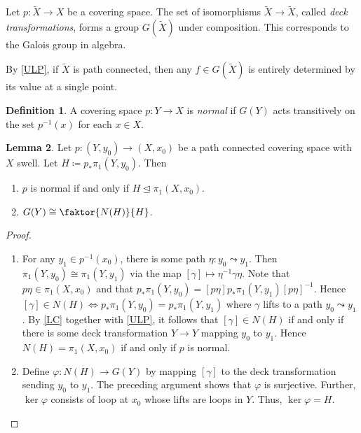 \documentclass[10pt,letterpaper,cm]{nupset}
\theoremstyle{definition}
\newtheorem{definition}{Definition}[subsection]
\theoremstyle{theorem}
\newtheorem{lemma}[definition]{Lemma}
\theoremstyle{remark}
\newcommand{\1}{\mathbb{1}}
\newcommand{\0}{\vec 0}
\begin{document}
\smallskip

Let $p: \widetilde{X} \to X$ be a covering space. The set of isomorphisms $\widetilde{X}  \to \widetilde{X} $, called \textit{deck transformations}, forms a group $G(\widetilde{X})$ under composition. This corresponds to the Galois group in algebra.

By \cref{ULP}, if $\widetilde{X}$ is path connected, then any $f\in G(\widetilde{X})$ is entirely determined by its value at a single point.

\begin{definition}
A covering space $p:Y \to X$ is \textit{normal} if $G(Y)$ acts transitively on the set $p^{-1}(x)$ for each $x\in X$.
\end{definition}

\begin{lemma}
Let $p: \left(Y, y_0\right) \to \left(X, x_0\right)$ be a path connected covering space with $X$ swell. Let $H\coloneqq  p_{\ast}\pi_1\left(Y, y_0\right)$. Then 
\begin{enumerate}
\item $p$ is normal if and only if $H \unlhd \pi_1\left(X, x_0\right)$.
\item $G(Y) \cong \faktor{N(H)}{H}$. 
\end{enumerate}
\end{lemma}
\begin{proof} $ $
\begin{enumerate}
\item For any $y_1 \in p^{-1}(x_0)$, there is some path $\eta : y_0 \leadsto y_1$. Then $\pi_1\left(Y, y_0\right) \cong \pi_1(Y, y_1)$ via the map $\left[\gamma\right] \mapsto \eta^{-1} \gamma \eta$. Note that $p \eta \in \pi_1\left(X, x_0\right)$ and that $p_{\ast} \pi_1\left(Y, y_0\right) = [p \eta]p_{\ast} \pi_1(Y, y_1) [p\eta]^{-1}$. Hence $\left[\gamma\right] \in N(H) \iff  p_{\ast} \pi_1\left(Y, y_0\right) = p_{\ast} \pi_1(Y, y_1)$ where $\gamma$ lifts to a path $y_0 \leadsto y_1$. By \cref{LC} together with \cref{ULP}, it follows that $\left[\gamma\right] \in N(H)$ if and only if there is some deck transformation $Y \to Y$ mapping $y_0$ to $y_1$. Hence $N(H) = \pi_1\left(X, x_0\right)$ if and only if $p$ is normal. 
\item Define $\varphi : N(H) \to G(Y)$ by mapping $\left[\gamma\right]$ to the deck transformation sending $y_0$ to $y_1$. The preceding argument shows that $\varphi$ is surjective. Further, $\ker{\varphi}$ consists of loop at $x_0$ whose lifts are loops in $Y$. Thus, $\ker{\varphi} = H$. 
\end{enumerate}
\end{proof}
\end{document}
